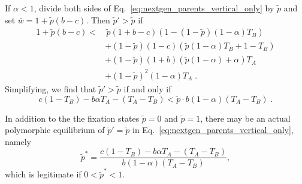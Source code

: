 \documentclass[12pt]{extarticle}
\begin{document}
{If $\alpha<1$, divide both sides of Eq.\ \ref{eq:nextgen_parents_vertical_only} by $\tilde{p}$ and set $\bar{w} = 1 + \tilde{p}(b-c)$. Then $\tilde{p}'>\tilde{p}$ if
\begin{equation}
\begin{aligned} 
  1 + \tilde{p}(b-c) < 
  & \, \tilde{p}(1+b-c) (1 - (1-\tilde{p}) (1-\alpha) T_B) \\
  & + (1-\tilde{p}) (1-c) (\tilde{p} (1-\alpha) T_B + 1 - T_B) \\
  & + (1-\tilde{p}) (1+b) (\tilde{p} (1-\alpha) + \alpha) T_A \\
  & + (1-\tilde{p})^2 (1-\alpha) T_A \;.
\end{aligned}
\end{equation}
Simplifying, we find that $\tilde{p}'>\tilde{p}$ if and only if
\begin{equation} \label{eq:vert_hori_global_condition}
c(1-T_B) - b \alpha T_A - (T_A-T_B) < \tilde{p} \cdot b (1-\alpha) (T_A-T_B) \;.
\end{equation}

In addition to the the fixation states $\tilde{p}=0$ and $\tilde{p}=1$, there may be an actual polymorphic equilibrium of $\tilde{p}'=\tilde{p}$ in Eq.\ \ref{eq:nextgen_parents_vertical_only}, namely 
\begin{equation} \label{eq:vert_hori_equilibrium}
  \tilde{p}^* = 
  \frac{c(1-T_B) - b \alpha T_A - (T_A-T_B)}{b (1-\alpha) (T_A-T_B)} ,
\end{equation} 
which is legitimate if $0<\tilde{p}^*<1$.

}
\end{document}

